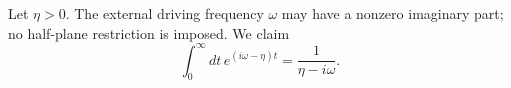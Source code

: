 \documentclass{article}
\begin{document}
Let $\eta>0$.  The external driving frequency $\omega$ may have a nonzero
imaginary part; no half-plane restriction is imposed.  We claim
\begin{equation}
\int_0^{\infty}dt\,e^{(i\omega-\eta)t}=\frac{1}{\eta-i\omega}.
\label{off-real-axis}
\end{equation}
\end{document}
